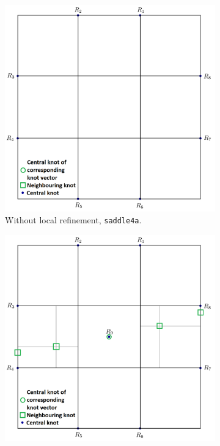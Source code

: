 \documentclass{article}
\begin{document}
\begin{figure}[H]
\centering
\begin{subfigure}[b]{0.32\textwidth}
\includegraphics[width=\textwidth]{saddle4aparam}
\caption{Without local refinement, \texttt{saddle4a}.}
\label{saddle4ap}
\end{subfigure}
\begin{subfigure}[b]{0.32\textwidth}
\includegraphics[width=\textwidth]{saddle4bparam}

\end{subfigure}
\end{figure}
\end{document}
